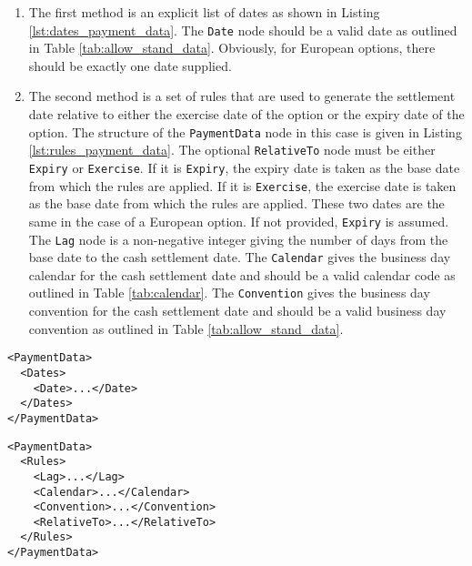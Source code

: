 \begin{itemize}
\begin{enumerate}
\item
The first method is an explicit list of dates as shown in Listing \ref{lst:dates_payment_data}. The \lstinline!Date! node should be a valid date as outlined in Table \ref{tab:allow_stand_data}. Obviously, for European options, there should be exactly one date supplied.

\item
The second method is a set of rules that are used to generate the settlement date relative to either the exercise date of the option or the expiry date of the option. The structure of the \lstinline!PaymentData! node in this case is given in Listing \ref{lst:rules_payment_data}. The optional \lstinline!RelativeTo! node must be either \lstinline!Expiry! or \lstinline!Exercise!. If it is \lstinline!Expiry!, the expiry date is taken as the base date from which the rules are applied. If it is \lstinline!Exercise!, the exercise date is taken as the base date from which the rules are applied. These two dates are the same in the case of a European option. If not provided, \lstinline!Expiry! is assumed. The \lstinline!Lag! node is a non-negative integer giving the number of days from the base date to the cash settlement date. The \lstinline!Calendar! gives the business day calendar for the cash settlement date and should be a valid calendar code as outlined in Table \ref{tab:calendar}. The \lstinline!Convention! gives the business day convention for the cash settlement date and should be a valid business day convention as outlined in Table \ref{tab:allow_stand_data}.

\end{enumerate}

\end{itemize}

\begin{listing}[H]
\begin{verbatim}
<PaymentData>
  <Dates>
    <Date>...</Date>
  </Dates>
</PaymentData>
\end{verbatim}
\caption{Dates based \lstinline!PaymentData!}
\label{lst:dates_payment_data}
\end{listing}

\begin{listing}[H]
\begin{verbatim}
<PaymentData>
  <Rules>
    <Lag>...</Lag>
    <Calendar>...</Calendar>
    <Convention>...</Convention>
    <RelativeTo>...</RelativeTo>
  </Rules>
</PaymentData>
\end{verbatim}
\caption{Rules based \lstinline!PaymentData!}
\label{lst:rules_payment_data}
\end{listing}

